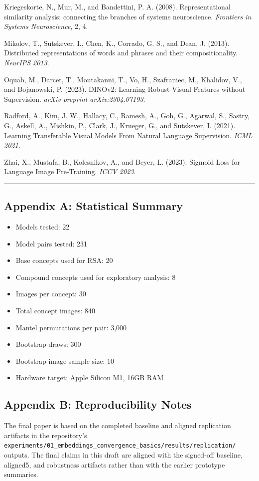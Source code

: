 \documentclass[
]{article}
\providecommand{\tightlist}{%
  \setlength{\itemsep}{0pt}\setlength{\parskip}{0pt}}
\begin{document}
Kriegeskorte, N., Mur, M., and Bandettini, P. A. (2008).
Representational similarity analysis: connecting the branches of systems
neuroscience. \emph{Frontiers in Systems Neuroscience}, 2, 4.

Mikolov, T., Sutskever, I., Chen, K., Corrado, G. S., and Dean, J.
(2013). Distributed representations of words and phrases and their
compositionality. \emph{NeurIPS 2013}.

Oquab, M., Darcet, T., Moutakanni, T., Vo, H., Szafraniec, M., Khalidov,
V., and Bojanowski, P. (2023). DINOv2: Learning Robust Visual Features
without Supervision. \emph{arXiv preprint arXiv:2304.07193}.

Radford, A., Kim, J. W., Hallacy, C., Ramesh, A., Goh, G., Agarwal, S.,
Sastry, G., Askell, A., Mishkin, P., Clark, J., Krueger, G., and
Sutskever, I. (2021). Learning Transferable Visual Models From Natural
Language Supervision. \emph{ICML 2021}.

Zhai, X., Mustafa, B., Kolesnikov, A., and Beyer, L. (2023). Sigmoid
Loss for Language Image Pre-Training. \emph{ICCV 2023}.

\begin{center}\rule{0.5\linewidth}{0.5pt}\end{center}

\subsection{Appendix A: Statistical
Summary}\label{appendix-a-statistical-summary}

\begin{itemize}
\tightlist
\item
  Models tested: 22
\item
  Model pairs tested: 231
\item
  Base concepts used for RSA: 20
\item
  Compound concepts used for exploratory analysis: 8
\item
  Images per concept: 30
\item
  Total concept images: 840
\item
  Mantel permutations per pair: 3,000
\item
  Bootstrap draws: 300
\item
  Bootstrap image sample size: 10
\item
  Hardware target: Apple Silicon M1, 16GB RAM
\end{itemize}

\subsection{Appendix B: Reproducibility
Notes}\label{appendix-b-reproducibility-notes}

The final paper is based on the completed baseline and aligned
replication artifacts in the repository's
\texttt{experiments/01\_embeddings\_convergence\_basics/results/replication/}
outputs. The final claims in this draft are aligned with the signed-off
baseline, aligned5, and robustness artifacts rather than with the
earlier prototype summaries.
\end{document}
